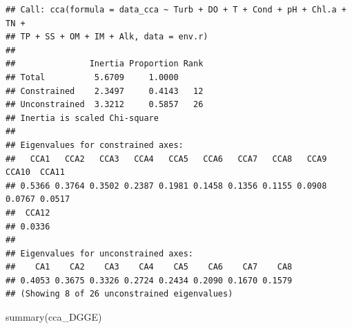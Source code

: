 \documentclass[
]{book}
\newenvironment{Shaded}{\begin{snugshade}}{\end{snugshade}}
\newcommand{\FunctionTok}[1]{\textcolor[rgb]{0.00,0.00,0.00}{#1}}
\newcommand{\NormalTok}[1]{#1}
\begin{document}
\begin{verbatim}
## Call: cca(formula = data_cca ~ Turb + DO + T + Cond + pH + Chl.a + TN +
## TP + SS + OM + IM + Alk, data = env.r)
## 
##               Inertia Proportion Rank
## Total          5.6709     1.0000     
## Constrained    2.3497     0.4143   12
## Unconstrained  3.3212     0.5857   26
## Inertia is scaled Chi-square 
## 
## Eigenvalues for constrained axes:
##   CCA1   CCA2   CCA3   CCA4   CCA5   CCA6   CCA7   CCA8   CCA9  CCA10  CCA11 
## 0.5366 0.3764 0.3502 0.2387 0.1981 0.1458 0.1356 0.1155 0.0908 0.0767 0.0517 
##  CCA12 
## 0.0336 
## 
## Eigenvalues for unconstrained axes:
##    CA1    CA2    CA3    CA4    CA5    CA6    CA7    CA8 
## 0.4053 0.3675 0.3326 0.2724 0.2434 0.2090 0.1670 0.1579 
## (Showing 8 of 26 unconstrained eigenvalues)
\end{verbatim}

\begin{Shaded}
\begin{Highlighting}[]
\FunctionTok{summary}\NormalTok{(cca\_DGGE)}
\end{Highlighting}
\end{Shaded}
\end{document}
